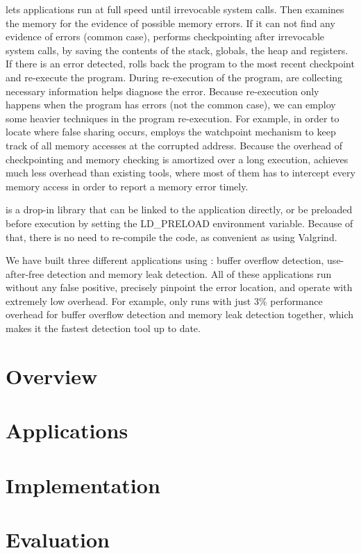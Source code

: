 \doubletake{} lets applications run at full speed until irrevocable system calls. Then \doubletake{} examines the memory for the evidence of possible memory errors. If it can not find any evidence of errors (common case), \doubletake{} performs checkpointing after irrevocable system calls, by saving the contents of the stack, globals, the heap and registers.  If there is an error detected, \doubletake{} rolls back the program to the most recent checkpoint and re-execute the program. During re-execution of the program, \doubletake{} are collecting necessary information helps diagnose the error. Because re-execution only happens when the program has errors (not the common case), we can employ some heavier techniques in the program re-execution. For example, in order to locate where false sharing occurs, \doubletake{} employs the watchpoint mechanism to keep track of all memory accesses at the corrupted address. Because the overhead of checkpointing and memory checking is amortized over a long execution, \doubletake{} achieves much less overhead than existing tools, where most of them has to intercept every memory access in order to report a memory error timely.

\doubletake{} is a drop-in library that can be linked to the application directly, or be preloaded before execution by setting the LD\_PRELOAD environment variable. 
Because of that, there is no need to re-compile the code, as convenient as using Valgrind.     

We have built three different applications using \doubletake{}: buffer overflow detection, use-after-free detection and memory leak detection. All of these applications run without any false positive, precisely pinpoint the error location, and operate with extremely low overhead. For example, \doubletake{} only runs with just 3\% performance overhead for buffer overflow detection and memory leak detection together, which makes it the fastest detection tool up to date. 

\section{Overview}


\section{Applications}


\section{Implementation} 


\section{Evaluation}

